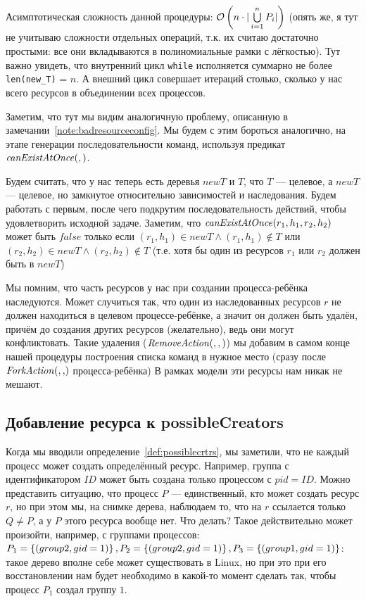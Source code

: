 Асимптотическая сложность данной процедуры:  $\mathcal{O}\left(n\cdot|\bigcup\limits_{i = 1}^{n}{P_i}|\right)$ (опять же, я тут не учитываю сложности отдельных операций, т.к. их считаю достаточно простыми: все они вкладываются в полиномиальные рамки с лёгкостью). Тут важно увидеть, что внутренний цикл \texttt{while} исполняется суммарно не более \texttt{len(new\_T)} = $n$. А внешний цикл совершает итераций столько, сколько у нас всего ресурсов в объединении всех процессов.

Заметим, что тут мы видим аналогичную проблему, описанную в замечании~\ref{note:badresourceconfig}. Мы будем с этим бороться аналогично, на этапе генерации последовательности команд, используя предикат $\text{\textit{canExistAtOnce}}(, )$.

Будем считать, что у нас теперь есть деревья $newT$ и $T$, что $T$ --- целевое, а $newT$ --- целевое, но замкнутое относительно зависимостей и наследования. Будем работать с первым, после чего подкрутим последовательность действий, чтобы удовлетворить исходной задаче. Заметим, что $\text{\textit{canExistAtOnce}}(r_1, h_1, r_2, h_2)$ может быть $false$ только если $(r_1, h_1) \in newT \land (r_1, h_1) \notin T$ или $(r_2, h_2) \in newT \land (r_2, h_2) \notin T$ (т.е. хотя бы один из ресурсов $r_1$ или $r_2$ должен быть в $newT$)

\begin{note}
Мы помним, что часть ресурсов у нас при создании процесса-ребёнка наследуются. Может случиться так, что один из наследованных ресурсов $r$ не должен находиться в целевом процессе-ребёнке, а значит он должен быть удалён, причём до создания других ресурсов (желательно), ведь они могут конфликтовать. Такие удаления ($\text{\textit{RemoveAction}}(, , )$) мы добавим в самом конце нашей процедуры построения списка команд в нужное место (сразу после $\crfork{}{}$ процесса-ребёнка) В рамках модели эти ресурсы нам никак не мешают.
\end{note}

\subsection{Добавление ресурса к possibleCreators}

Когда мы вводили определение~\ref{def:possiblecrtrs}, мы заметили, что не каждый процесс может создать определённый ресурс. Например, группа с идентификатором $ID$ может быть создана только процессом с $pid = ID$. Можно представить ситуацию, что процесс $P$ --- единственный, кто может создать ресурс $r$, но при этом мы, на снимке дерева, наблюдаем то, что на $r$ ссылается только $Q \neq P$, а у $P$ этого ресурса вообще нет. Что делать? Такое действительно может произойти, например, с группами процессов: $P_1 = \left\lbrace (group 2, gid=1) \right\rbrace, P_2 = \left\lbrace (group 2, gid=1) \right\rbrace, P_3 = \left\lbrace (group 1, gid=1) \right\rbrace$: такое дерево вполне себе может существовать в Linux, но при это при его восстановлении нам будет необходимо в какой-то момент сделать так, чтобы процесс $P_1$ создал группу $1$.

